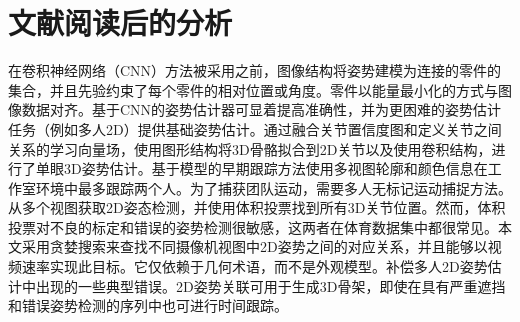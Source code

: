 \documentclass[a4paper,12pt,onecolumn,songti]{article}
\begin{document}
	\section{文献阅读后的分析}
		在卷积神经网络（CNN）方法被采用之前，图像结构将姿势建模为连接的零件的集合，并且先验约束了每个零件的相对位置或角度。零件以能量最小化的方式与图像数据对齐。基于CNN的姿势估计器可显着提高准确性，并为更困难的姿势估计任务（例如多人2D）提供基础姿势估计。通过融合关节置信度图和定义关节之间关系的学习向量场，使用图形结构将3D骨骼拟合到2D关节以及使用卷积结构，进行了单眼3D姿势估计。基于模型的早期跟踪方法使用多视图轮廓和颜色信息在工作室环境中最多跟踪两个人。为了捕获团队运动，需要多人无标记运动捕捉方法。从多个视图获取2D姿态检测，并使用体积投票找到所有3D关节位置。然而，体积投票对不良的标定和错误的姿势检测很敏感，这两者在体育数据集中都很常见。本文采用贪婪搜索来查找不同摄像机视图中2D姿势之间的对应关系，并且能够以视频速率实现此目标。它仅依赖于几何术语，而不是外观模型。补偿多人2D姿势估计中出现的一些典型错误。2D姿势关联可用于生成3D骨架，即使在具有严重遮挡和错误姿势检测的序列中也可进行时间跟踪。
\end{document}
